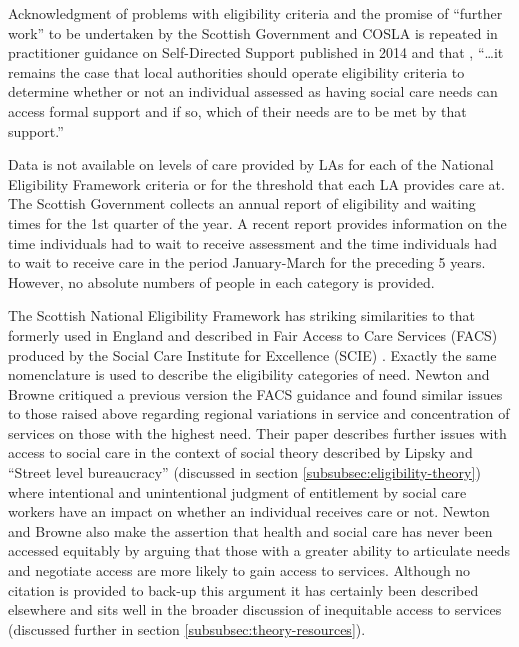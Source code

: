\documentclass[12pt,]{report}
\begin{document}
Acknowledgment of problems with eligibility criteria and the promise of
``further work'' to be undertaken by the Scottish Government and COSLA
is repeated in practitioner guidance on Self-Directed Support published
in 2014 \citep[pp.19]{RN170} and that , ``\ldots{}it remains the case
that local authorities should operate eligibility criteria to determine
whether or not an individual assessed as having social care needs can
access formal support and if so, which of their needs are to be met by
that support.''

Data is not available on levels of care provided by LAs for each of the
National Eligibility Framework criteria or for the threshold that each
LA provides care at. The Scottish Government collects an annual report
of eligibility and waiting times for the 1st quarter of the year. A
recent report \citep{RN184} provides information on the time individuals
had to wait to receive assessment and the time individuals had to wait
to receive care in the period January-March for the preceding 5 years.
However, no absolute numbers of people in each category is provided.

The Scottish National Eligibility Framework has striking similarities to
that formerly used in England and described in Fair Access to Care
Services (FACS) produced by the Social Care Institute for Excellence
(SCIE) \citeyearpar{RN138}. Exactly the same nomenclature is used to
describe the eligibility categories of need. Newton and Browne
\citeyearpar{RN163} critiqued a previous version the FACS guidance and
found similar issues to those raised above regarding regional variations
in service and concentration of services on those with the highest need.
Their paper describes further issues with access to social care in the
context of social theory described by Lipsky \citeyearpar{RN174} and
``Street level bureaucracy'' (discussed in section
\ref{subsubsec:eligibility-theory}) where intentional and unintentional
judgment of entitlement by social care workers have an impact on whether
an individual receives care or not. Newton and Browne
\citeyearpar{RN163} also make the assertion that health and social care
has never been accessed equitably by arguing that those with a greater
ability to articulate needs and negotiate access are more likely to gain
access to services. Although no citation is provided to back-up this
argument it has certainly been described elsewhere \citep{RN118} and
sits well in the broader discussion of inequitable access to services
\citep{RN116, RN175, RN120} (discussed further in section
\ref{subsubsec:theory-resources}).
\end{document}
